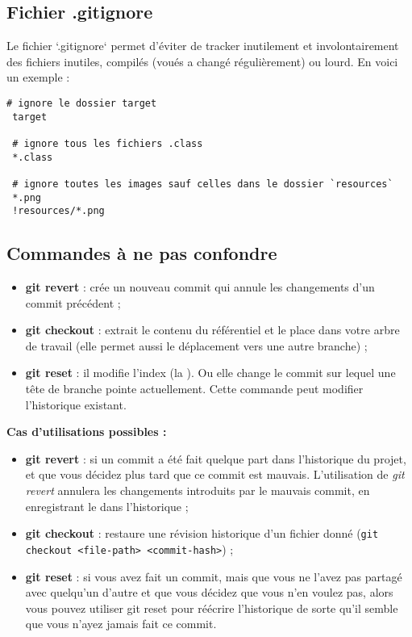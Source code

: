 \documentclass[11pt,a4paper,oneside]{article}
\begin{document}
\subsection{Fichier .gitignore}

Le fichier `.gitignore` permet d'éviter de tracker inutilement et involontairement des fichiers inutiles, compilés 
(voués a changé régulièrement) ou lourd. En voici un exemple :

\vspace{2mm}
\begin{lstlisting}[style=custombash]
 # ignore le dossier target
 target

 # ignore tous les fichiers .class
 *.class

 # ignore toutes les images sauf celles dans le dossier `resources`
 *.png
 !resources/*.png
\end{lstlisting}

\subsection{Commandes à ne pas confondre}


\begin{itemize}
	\item \textbf{git revert} : crée un nouveau commit qui annule les changements d'un commit précédent ;
	\item \textbf{git checkout} : extrait le contenu du référentiel et le place dans votre arbre de travail (elle permet aussi le déplacement vers une autre branche) ;
	\item \textbf{git reset} : il modifie l'index (la ). Ou elle change le commit sur lequel une tête de branche pointe actuellement. Cette commande peut modifier l'historique existant. 
\end{itemize}

\textbf{Cas d'utilisations possibles :}

\begin{itemize}
	\item \textbf{git revert} : si un commit a été fait quelque part dans l'historique du projet, et que vous décidez plus tard que ce commit est mauvais. L'utilisation de \textit{git revert} annulera les changements introduits par le mauvais commit, en enregistrant le  dans l'historique ;
	\item \textbf{git checkout} : restaure une révision historique d'un fichier donné (\texttt{git checkout <file-path> <commit-hash>}) ;
	\item \textbf{git reset} : si vous avez fait un commit, mais que vous ne l'avez pas partagé avec quelqu'un d'autre et que vous décidez que vous n'en voulez pas, alors vous pouvez utiliser git reset pour réécrire l'historique de sorte qu'il semble que vous n'ayez jamais fait ce commit. 
\end{itemize}
\end{document}
